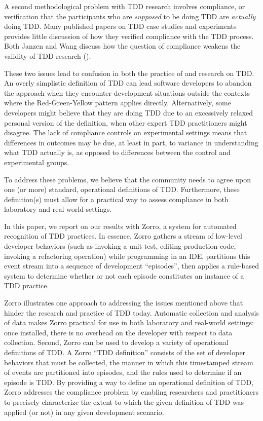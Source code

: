 \documentclass[smallextended]{svjour3}     %
\begin{document}
A second methodological problem with TDD research involves compliance, or
verification that the participants who are {\em supposed} to be doing TDD are
{\em actually} doing TDD. Many published papers on TDD case studies and
experiments provides little discussion of how they verified compliance with
the TDD process.  Both Janzen and Wang discuss how the question of
compliance weakens the validity of TDD research (\cite{Janzen:05, Wang:04}).

These two issues lead to confusion in both the practice of and research on
TDD.  An overly simplistic definition of TDD can lead software developers
to abandon the approach when they encounter development situations outside
the contexts where the Red-Green-Yellow pattern applies directly.
Alternatively, some developers might believe that they are doing TDD due to
an excessively relaxed personal version of the definition, when other
expert TDD practitioners might disagree.  The lack of compliance controls
on experimental settings means that differences in outcomes may be due, at
least in part, to variance in understanding what TDD actually is, as
opposed to differences between the control and experimental groups.

To address these problems, we believe that the community needs to agree
upon one (or more) standard, operational definitions of TDD. Furthermore,
these definition(s) must allow for a practical way to assess compliance in
both laboratory and real-world settings.

In this paper, we report on our results with Zorro, a system for
automated recognition of TDD practices.  In essence, Zorro gathers a stream
of low-level developer behaviors (such as invoking a unit test, editing
production code, invoking a refactoring operation) while programming in an
IDE, partitions this event stream into a sequence of development
``episodes'', then applies a rule-based system to determine whether or 
not each episode constitutes an instance of a TDD practice. 

Zorro illustrates one approach to addressing the issues mentioned above
that hinder the research and practice of TDD today.  Automatic collection
and analysis of data makes Zorro practical for use in both laboratory and
real-world settings: once installed, there is no overhead on the developer
with respect to data collection.  Second, Zorro can be used to develop a
variety of operational definitions of TDD. A Zorro ``TDD definition''
consists of the set of developer behaviors that must be collected, the
manner in which this timestamped stream of events are partitioned into
episodes, and the rules used to determine if an episode is TDD.  By
providing a way to define an operational definition of TDD, Zorro addresses
the compliance problem by enabling researchers and practitioners to
precisely characterize the extent to which the given definition of TDD was
applied (or not) in any given development scenario.
\end{document}
